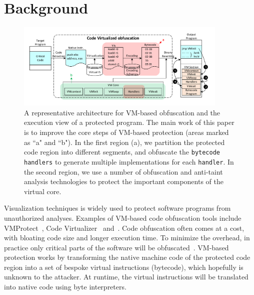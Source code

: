 \section{Background}\label{sec:background}
\begin{figure}[!t]
\centering
\includegraphics[width=0.9\textwidth]{fig/vmprotection.pdf}
\caption{A representative architecture for VM-based obfuscation and the execution view of a protected program. The main work of this paper is to improve the core steps of VM-based protection (areas marked as ``a" and ``b").
In the first region (a), we partition the protected code region into different segments, and obfuscate the \texttt{bytecode handlers} to generate multiple implementations for each \texttt{handler}.
In the second region, we use a number of obfuscation and anti-taint analysis technologies to protect the important components of the virtual core.}
\label{fig:vmprotection}
\end{figure}

Visualization techniques is widely used to protect software programs from unauthorized analyses.
Examples of VM-based code obfuscation tools include VMProtect~\cite{vmp}, Code Virtualizer~\cite{cv} and~\cite{Themida}.
Code obfuscation often comes at a cost, with bloating code size and longer execution time.
To minimize the overhead, in practice only critical parts of the software will be obfuscated~\cite{geneiatakis2012adaptive}.
VM-based  protection works by transforming the native machine code of the protected code region into
a set of bespoke virtual instructions (bytecode), which hopefully is unknown to the attacker.
At runtime, the virtual instructions will be translated into native code using byte interpreters.



